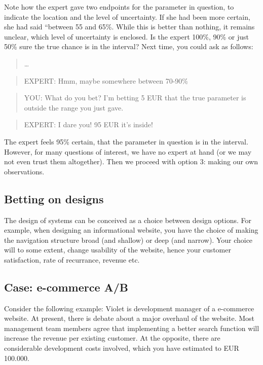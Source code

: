 \documentclass[]{svmono}
\begin{document}
Note how the expert gave two endpoints for the parameter in question, to
indicate the location and the level of uncertainty. If she had been more
certain, she had said ``between 55 and 65\%. While this is better than
nothing, it remains unclear, which level of uncertainty is enclosed. Is
the expert 100\%, 90\% or just 50\% sure the true chance is in the
interval? Next time, you could ask as follows:

\begin{quote}
\ldots{}
\end{quote}

\begin{quote}
EXPERT: Hmm, maybe somewhere between 70-90\%
\end{quote}

\begin{quote}
YOU: What do you bet? I'm betting 5 EUR that the true parameter is
outside the range you just gave.
\end{quote}

\begin{quote}
EXPERT: I dare you! 95 EUR it's inside!
\end{quote}

The expert feels 95\% certain, that the parameter in question is in the
interval. However, for many questions of interest, we have no expert at
hand (or we may not even trust them altogether). Then we proceed with
option 3: making our own observations.

\subsection{Betting on designs}\label{betting-on-designs}

The design of systems can be conceived as a choice between design
options. For example, when designing an informational website, you have
the choice of making the navigation structure broad (and shallow) or
deep (and narrow). Your choice will to some extent, change usability of
the website, hence your customer satisfaction, rate of recurrance,
revenue etc.

\subsection{Case: e-commerce A/B}\label{case-e-commerce-ab}

Consider the following example: Violet is development manager of a
e-commerce website. At present, there is debate about a major overhaul
of the website. Most management team members agree that implementing a
better search function will increase the revenue per existing customer.
At the opposite, there are considerable development costs involved,
which you have estimated to EUR 100.000.
\end{document}
